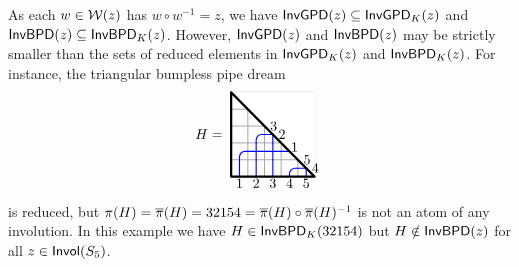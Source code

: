 \documentclass[10pt]{article}
\begin{document}
As each $w \in \mathcal{W}(z)$ has $w\circ w^{-1}=z$,
we have
$\mathsf{InvGPD}(z)\subseteq \mathsf{InvGPD}_K(z)$
and
$\mathsf{InvBPD}(z)\subseteq \mathsf{InvBPD}_K(z)$.
However, $\mathsf{InvGPD}(z)$ and $\mathsf{InvBPD}(z)$
may be strictly smaller than the sets of reduced 
elements in 
$ \mathsf{InvGPD}_K(z)$
and
$\mathsf{InvBPD}_K(z)$.
For instance, the triangular bumpless pipe dream
\[
H=
\begin{tikzpicture}[x=\bpdwidth,y=\bpdwidth,line cap=round,line join=round,baseline=(z.base)]
\node at (0,2.25) (z) {};
\draw[gray!70, line width=0.7pt](0,0)--(5,0);
\draw[gray!70, line width=0.7pt](0,0)--(0,5);
\draw[gray!70, line width=0.7pt](0,1)--(5,1);
\draw[gray!70, line width=0.7pt](1,0)--(1,5);
\draw[gray!70, line width=0.7pt](0,2)--(5,2);
\draw[gray!70, line width=0.7pt](2,0)--(2,5);
\draw[gray!70, line width=0.7pt](0,3)--(5,3);
\draw[gray!70, line width=0.7pt](3,0)--(3,5);
\draw[gray!70, line width=0.7pt](0,4)--(5,4);
\draw[gray!70, line width=0.7pt](4,0)--(4,5);
\draw[gray!70, line width=0.7pt](0,5)--(5,5);
\draw[gray!70, line width=0.7pt](5,0)--(5,5);
\draw[thick,rounded corners,color=blue] (3.5,0)--(3.5,0.5)--(4,0.5);
\draw[thick,rounded corners,color=blue] (3,1.5)--(4,1.5);
\draw[thick,rounded corners,color=blue] (1.5,2)--(1.5,2.5)--(2,2.5);
\draw[thick,rounded corners,color=blue] (0.5,1)--(0.5,1.5)--(1,1.5);
\draw[thick,rounded corners,color=blue] (0.5,0)--(0.5,1);
\draw[thick,rounded corners,color=blue] (1,1.5)--(2,1.5);
\draw[thick,rounded corners,color=blue] (1.5,1)--(1.5,2);
\draw[thick,rounded corners,color=blue] (2,1.5)--(3,1.5);
\draw[thick,rounded corners,color=blue] (2.5,1)--(2.5,2);
\draw[thick,rounded corners,color=blue] (1.5,0)--(1.5,1);
\draw[thick,rounded corners,color=blue] (2,2.5)--(3,2.5);
\draw[thick,rounded corners,color=blue] (2.5,2)--(2.5,3);
\draw[thick,rounded corners,color=blue] (2.5,0)--(2.5,1);
\draw[thick,rounded corners,color=blue] (4,0.5)--(5,0.5);
\draw[thick,rounded corners,color=blue] (4.5,0)--(4.5,1);
\draw[white, line width=0.7pt,fill=white] (0,5)--(5,0)--(5,5)--(0,5);
\draw[black, line width=1.6pt] (0,5)--(5,0)--(0,0)--(0,5);
\draw[](0.5,-0.4) node {1};
\draw[](1.5,-0.4) node {2};
\draw[](2.5,-0.4) node {3};
\draw[](3.5,-0.4) node {4};
\draw[](4.5,-0.4) node {5};
\draw[](2.55,3.0) node {3};
\draw[](3.05,2.5) node {2};
\draw[](3.8,1.75) node {1};
\draw[](4.55,1.0) node {5};
\draw[](5.05,0.5) node {4};
\end{tikzpicture}
\]
is reduced, but $\pi(H) = \overline{\pi}(H) = 32154 = \overline{\pi}(H)\circ \overline{\pi}(H)^{-1}$ is not an atom of any involution.
In this example we have $H \in \mathsf{InvBPD}_K(32154) $ but $H \notin \mathsf{InvBPD}(z)$ for all $z \in\mathsf{Invol}(S_5)$.
\end{document}
